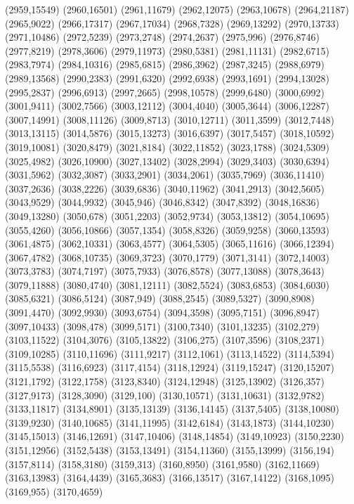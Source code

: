 (2959,15549)
(2960,16501)
(2961,11679)
(2962,12075)
(2963,10678)
(2964,21187)
(2965,9022)
(2966,17317)
(2967,17034)
(2968,7328)
(2969,13292)
(2970,13733)
(2971,10486)
(2972,5239)
(2973,2748)
(2974,2637)
(2975,996)
(2976,8746)
(2977,8219)
(2978,3606)
(2979,11973)
(2980,5381)
(2981,11131)
(2982,6715)
(2983,7974)
(2984,10316)
(2985,6815)
(2986,3962)
(2987,3245)
(2988,6979)
(2989,13568)
(2990,2383)
(2991,6320)
(2992,6938)
(2993,1691)
(2994,13028)
(2995,2837)
(2996,6913)
(2997,2665)
(2998,10578)
(2999,6480)
(3000,6992)
(3001,9411)
(3002,7566)
(3003,12112)
(3004,4040)
(3005,3644)
(3006,12287)
(3007,14991)
(3008,11126)
(3009,8713)
(3010,12711)
(3011,3599)
(3012,7448)
(3013,13115)
(3014,5876)
(3015,13273)
(3016,6397)
(3017,5457)
(3018,10592)
(3019,10081)
(3020,8479)
(3021,8184)
(3022,11852)
(3023,1788)
(3024,5309)
(3025,4982)
(3026,10900)
(3027,13402)
(3028,2994)
(3029,3403)
(3030,6394)
(3031,5962)
(3032,3087)
(3033,2901)
(3034,2061)
(3035,7969)
(3036,11410)
(3037,2636)
(3038,2226)
(3039,6836)
(3040,11962)
(3041,2913)
(3042,5605)
(3043,9529)
(3044,9932)
(3045,946)
(3046,8342)
(3047,8392)
(3048,16836)
(3049,13280)
(3050,678)
(3051,2203)
(3052,9734)
(3053,13812)
(3054,10695)
(3055,4260)
(3056,10866)
(3057,1354)
(3058,8326)
(3059,9258)
(3060,13593)
(3061,4875)
(3062,10331)
(3063,4577)
(3064,5305)
(3065,11616)
(3066,12394)
(3067,4782)
(3068,10735)
(3069,3723)
(3070,1779)
(3071,3141)
(3072,14003)
(3073,3783)
(3074,7197)
(3075,7933)
(3076,8578)
(3077,13088)
(3078,3643)
(3079,11888)
(3080,4740)
(3081,12111)
(3082,5524)
(3083,6853)
(3084,6030)
(3085,6321)
(3086,5124)
(3087,949)
(3088,2545)
(3089,5327)
(3090,8908)
(3091,4470)
(3092,9930)
(3093,6754)
(3094,3598)
(3095,7151)
(3096,8947)
(3097,10433)
(3098,478)
(3099,5171)
(3100,7340)
(3101,13235)
(3102,279)
(3103,11522)
(3104,3076)
(3105,13822)
(3106,275)
(3107,3596)
(3108,2371)
(3109,10285)
(3110,11696)
(3111,9217)
(3112,1061)
(3113,14522)
(3114,5394)
(3115,5538)
(3116,6923)
(3117,4154)
(3118,12924)
(3119,15247)
(3120,15207)
(3121,1792)
(3122,1758)
(3123,8340)
(3124,12948)
(3125,13902)
(3126,357)
(3127,9173)
(3128,3090)
(3129,100)
(3130,10571)
(3131,10631)
(3132,9782)
(3133,11817)
(3134,8901)
(3135,13139)
(3136,14145)
(3137,5405)
(3138,10080)
(3139,9230)
(3140,10685)
(3141,11995)
(3142,6184)
(3143,1873)
(3144,10230)
(3145,15013)
(3146,12691)
(3147,10406)
(3148,14854)
(3149,10923)
(3150,2230)
(3151,12956)
(3152,5438)
(3153,13491)
(3154,11360)
(3155,13999)
(3156,194)
(3157,8114)
(3158,3180)
(3159,313)
(3160,8950)
(3161,9580)
(3162,11669)
(3163,13983)
(3164,4439)
(3165,3683)
(3166,13517)
(3167,14122)
(3168,1095)
(3169,955)
(3170,4659)
